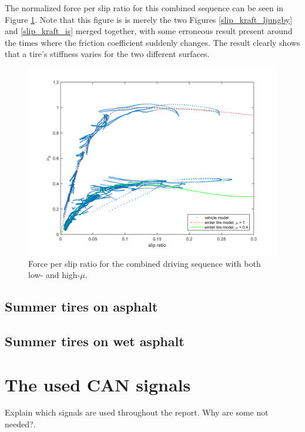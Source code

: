The normalized force per slip ratio for this combined sequence can be seen in Figure \ref{slip_kraft_comb2}. Note that this figure is is merely the two Figures \ref{slip_kraft_ljungby} and \ref{slip_kraft_is} merged together, with some erroneous result present around the times where the friction coefficient suddenly changes. The result clearly shows that a tire's stiffness varies for the two different surfaces.

\begin{figure}[h]
	\centering
	\includegraphics[width=1.0\textwidth]{Pictures/slip_kraft_comb2}
	\caption {Force per slip ratio for the combined driving sequence with both low- and high-$ \mu $.}
	\label{slip_kraft_comb2}
\end{figure}

\subsection{Summer tires on asphalt}


\subsection{Summer tires on wet asphalt}

\section{The used CAN signals}
Explain which signals are used throughout the report. Why are some not needed?.
